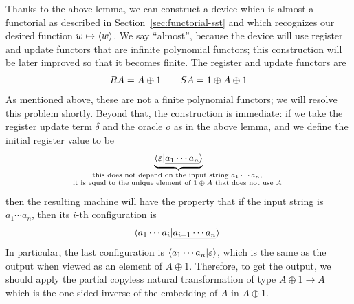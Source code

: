 Thanks to the above lemma, we can construct a device which is almost a functorial \sst as described in Section~\ref{sec:functorial-sst} and which recognizes our desired function $w \mapsto \langle w \rangle$. We say ``almost'', because the device will use register and update functors that are  infinite polynomial functors; this construction will be later improved so that it becomes finite.  The register and update functors are 
\begin{align*}
\functorr A  = A \oplus 1 \qquad \functors A = 1 \oplus A \oplus 1
\end{align*}
As mentioned above, these are  not a finite polynomial functors; we will resolve this problem shortly. Beyond that, the construction is immediate: if we take the register update term $\delta$ and the oracle $o$ as in the above lemma, and we define the initial register value to be 
\begin{align*}
\myunderbrace{\tuple{\varepsilon | \underline{a_1 \cdots a_n}}}{this does not depend on the input string $a_1 \cdots a_n$, \\ it is equal to the unique element of $1 \oplus A$ that does not use $A$}
\end{align*}
then the resulting machine will have the property that  if the input string is $a_1 \cdots a_n$, then its $i$-th configuration is 
\begin{align*}
\langle a_1 \cdots a_{i}| \underline{a_{i+1} \cdots a_n} \rangle.
\end{align*}
In particular, the last configuration is $\langle a_1 \cdots a_n | \varepsilon \rangle$, which is the same as the output when viewed as an element of $A \oplus 1$. Therefore, to get the output, we should apply the partial copyless natural transformation of type $A \oplus 1 \to A$ which is the one-sided inverse of the embedding of $A$ in $A \oplus 1$.  


